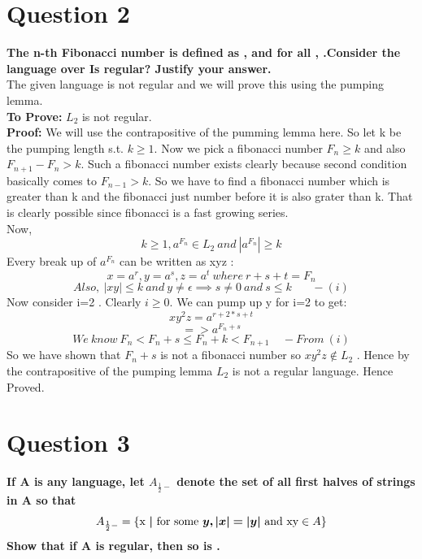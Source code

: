 \documentclass{article}
\begin{document}
\section{Question 2}
\textbf{The n-th Fibonacci number is defined as , and for all ,  .Consider the language over  Is  regular? Justify your answer.}\\
\newline
The given language is not regular and we will prove this using the pumping lemma. \\
\textbf{To Prove:} $L_2$ is not regular.\\
\textbf{Proof:} We will use the contrapositive of the pumming lemma here. So let k be the pumping length s.t. $k\geq 1$. Now we pick a fibonacci number $F_n\geq k$ and also $F_{n+1}-F_{n}>k$. Such a fibonacci number exists clearly because second condition basically comes to $F_{n-1}>k$. So we have to find a fibonacci number which is greater than k and the fibonacci just number before it is also grater than k. That is clearly possible since fibonacci is a fast growing series.\\
Now,
\[ k\geq 1 , a^{F_n}\in L_2 \ and \ |a^{F_n}|\geq k\] 
Every break up of $a^{F_n}$ can be written as xyz :
\[x=a^r,y=a^s,z=a^t\ where \ r+s+t=F_n\] 
\[ Also, \ |xy|\leq k \ and \ y\neq \epsilon \implies  s\neq0 \ and \ s\leq k\ \ \ \ \ \ \ \  -(i)\]
Now consider i=2 . Clearly  $i\geq0$.
We can pump up y for i=2 to get:
\[xy^2z = a^{r+2*s+t}\] 
\[=> a^{F_n+s}\] 
\[We \ know \ F_n<F_n+s\leq F_n+k<F_{n+1} \ \ \ \ \ - From\ (i)\]
So we have shown that $F_n+s$ is not a fibonacci number so $xy^2z\notin L_2$ . Hence by the contrapositive of the pumping lemma $L_2$ is not a regular language. Hence Proved.

\pagebreak



\section{Question 3}
\textbf{If A is any language, let $A_{\frac{1}{2}-}$ denote the set of all first halves of strings in A so that \[ A_{\frac{1}{2}-} = \text{\{x \boldsymbol{$|$} for some \boldsymbol{$y,|x|=|y|$} and xy} \in A\} \] 
        Show that if A is regular, then so is .\\}
\end{document}
